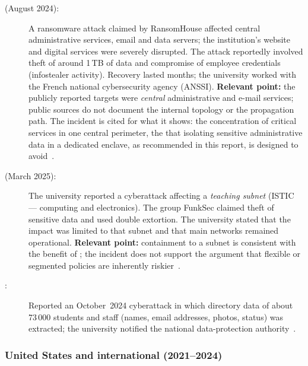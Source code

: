 \begin{description}
    \item[ (August 2024):] A
    ransomware attack claimed by RansomHouse affected central
    administrative services, email and data servers; the institution's
    website and digital services were severely disrupted. The attack
    reportedly involved theft of around 1\,TB of data and compromise of
    employee credentials (infostealer activity). Recovery lasted months; the
    university worked with the French national
    cybersecurity agency (ANSSI). \textbf{Relevant point:} the publicly
    reported targets were \emph{central} administrative and e-mail
    services; public sources do not document the internal topology or
    the propagation path. The incident is cited for what it shows: the
    concentration of critical services in one central perimeter, the
     that isolating sensitive
    administrative data in a dedicated enclave, as recommended in this
    report, is designed to avoid~\cite{paris-saclay-cyber,soccer-paris-saclay}.
    \item[ (March 2025):] The university
    reported a cyberattack affecting a \emph{teaching subnet} (ISTIC ---
    computing and electronics). The group FunkSec claimed theft of
    sensitive data and used double extortion. The university stated that
    the impact was limited to that subnet and that main networks remained
    operational. \textbf{Relevant point:} containment to a subnet is
    consistent with the benefit of ; the
    incident does not support the argument that flexible or segmented
    policies are inherently riskier~\cite{rennes-cyber}.
    \item[:]
    Reported an October~2024 cyberattack in which directory data of
    about 73\,000 students and staff (names, email addresses, photos,
    status) was extracted; the university notified the national
    data-protection authority~\cite{paris-sorbonne-cyber}.
\end{description}

\subsubsection{United States and international (2021--2024)}

